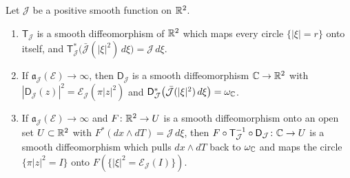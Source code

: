 \begin{lemma}[Normalisation]\label{lem:str-normalisation}
Let $\mathcal J$ be a positive smooth function on $\mathbb{R}^2$.
\begin{enumerate}[label=(\roman*)]
\item $\mathsf T_{\mathcal J}$ is a smooth diffeomorphism of $\mathbb{R}^2$ which maps every circle
$\{|\xi|=r\}$ onto itself, and $\mathsf T_{\mathcal J}^*\big(\bar{\mathcal J}(|\xi|^2)\,d\xi\big)=\mathcal J\,d\xi$.
\item If $\mathfrak a_{\mathcal J}(\mathcal E)\to\infty$, then $\mathsf D_{\mathcal J}$ is a smooth
diffeomorphism $\mathbb{C}\to\mathbb{R}^2$ with $|\mathsf D_{\mathcal J}(z)|^2=\mathcal E_{\mathcal J}(\pi|z|^2)$ and
$\mathsf D_{\mathcal J}^*\big(\bar{\mathcal J}(|\xi|^2)\,d\xi\big)=\omega_{\mathbb{C}}$.
\item If $\mathfrak a_{\mathcal J}(\mathcal E)\to\infty$ and $F\colon\mathbb{R}^2\to U$ is a smooth
diffeomorphism onto an open set $U\subset\mathbb{R}^2$ with $F^*(dx\wedge dT)=\mathcal J\,d\xi$, then
$F\circ\mathsf T_{\mathcal J}^{-1}\circ\mathsf D_{\mathcal J}\colon\mathbb{C}\to U$ is a smooth
diffeomorphism which pulls $dx\wedge dT$ back to $\omega_{\mathbb{C}}$ and maps the circle $\{\pi|z|^2=I\}$ onto
$F(\{|\xi|^2=\mathcal E_{\mathcal J}(I)\})$.
\end{enumerate}
\end{lemma}

